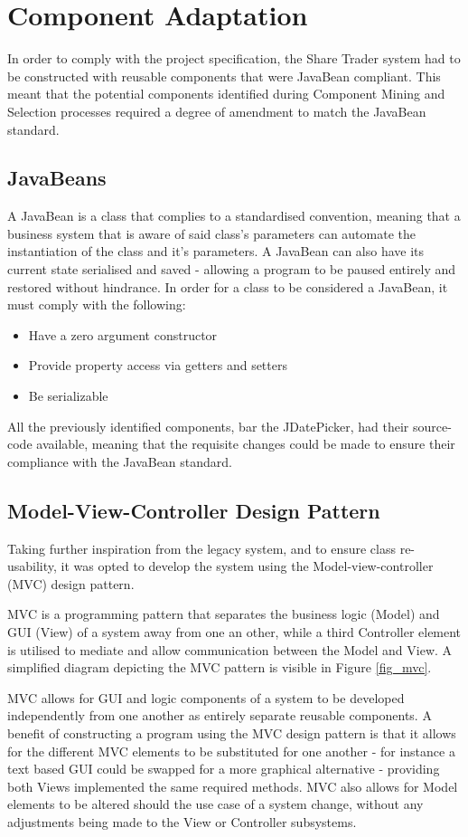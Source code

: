 \documentclass[12pt, a4paper,titlepage]{article}
\begin{document}
\section{Component Adaptation}
In order to comply with the project specification, the  Share Trader system
had to be constructed with reusable components that were JavaBean compliant.
This meant that the potential components identified during Component Mining
and Selection
processes  required a degree of amendment to match the JavaBean standard. 

\subsection{JavaBeans}
A JavaBean is a class that complies to a standardised convention, meaning that
a business system that is aware of said class’s parameters can automate the
instantiation of the class and it’s parameters. 
A JavaBean can also have its current state serialised and saved - allowing a
program to be paused entirely and restored without hindrance.  
In order for a class to be considered a JavaBean, it must comply with the
following:
\begin{itemize}
    \item Have a zero argument constructor
    \item Provide property access via getters and setters
    \item Be serializable
\end{itemize}

All the previously identified components, bar the JDatePicker, had their
source-code available, meaning that the requisite changes could be made to
ensure their compliance with the JavaBean standard.

\subsection{Model-View-Controller Design Pattern}
Taking further inspiration from the legacy system, and to ensure class
re-usability, it was opted to develop the system using the
Model-view-controller (MVC) design pattern.

MVC is a programming  pattern that separates the business logic (Model) and GUI
(View) of a system away from one an other, while a third Controller element is
utilised to mediate and allow communication between the Model and View.
A simplified diagram depicting the MVC pattern is visible in Figure
\ref{fig_mvc}.

MVC allows for GUI and logic components of a system to be developed
independently from one another as entirely separate reusable components.  
A benefit of constructing a program using the MVC design pattern is that it
allows for the different MVC elements to be substituted for one another - for
instance a text based GUI could be swapped for a more graphical alternative -
providing both Views implemented the same required methods.
MVC also allows for Model elements to be altered should the use case of a
system change, without any adjustments being made to the View or Controller
subsystems.
\end{document}
